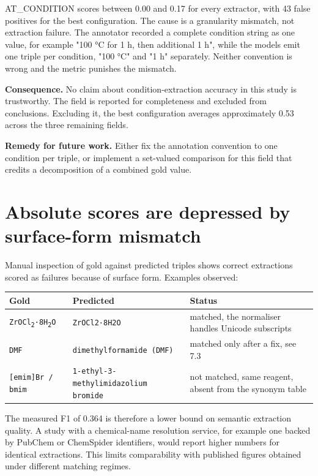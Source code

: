 \documentclass[11pt,a4paper,oneside]{report}
\begin{document}
AT\_CONDITION scores between 0.00 and 0.17 for every extractor, with 43 false positives for the best configuration. The cause is a granularity mismatch, not extraction failure. The annotator recorded a complete condition string as one value, for example "100 °C for 1 h, then additional 1 h", while the models emit one triple per condition, "100 °C" and "1 h" separately. Neither convention is wrong and the metric punishes the mismatch.

\textbf{Consequence.} No claim about condition-extraction accuracy in this study is trustworthy. The field is reported for completeness and excluded from conclusions. Excluding it, the best configuration averages approximately 0.53 across the three remaining fields.

\textbf{Remedy for future work.} Either fix the annotation convention to one condition per triple, or implement a set-valued comparison for this field that credits a decomposition of a combined gold value.

\section{Absolute scores are depressed by surface-form mismatch}

Manual inspection of gold against predicted triples shows correct extractions scored as failures because of surface form. Examples observed:

\par\medskip
\begingroup
\small\setlength{\tabcolsep}{6pt}
\begin{tabularx}{\linewidth}{@{}LLL@{}}
\toprule
\textbf{Gold} & \textbf{Predicted} & \textbf{Status} \\
\midrule
\texttt{ZrOCl\textsubscript{2}·8H\textsubscript{2}O} & \texttt{ZrOCl2·8H2O} & matched, the normaliser handles Unicode subscripts \\
\texttt{DMF} & \texttt{dimethylformamide (DMF)} & matched only after a fix, see 7.3 \\
\texttt{[emim]Br /\allowbreak{} bmim} & \texttt{1-\allowbreak{}ethyl-\allowbreak{}3-\allowbreak{}methylimidazolium bromide} & not matched, same reagent, absent from the synonym table \\
\bottomrule
\end{tabularx}
\endgroup
\par\medskip
The measured F1 of 0.364 is therefore a lower bound on semantic extraction quality. A study with a chemical-name resolution service, for example one backed by PubChem or ChemSpider identifiers, would report higher numbers for identical extractions. This limits comparability with published figures obtained under different matching regimes.
\end{document}
